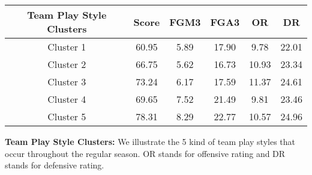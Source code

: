 \centering
\begin{tabular}{|c||c|c|c|c|c|} 
\hline
\textbf{Team Play Style Clusters} & Score & FGM3 & FGA3 & OR & DR \\ 
\hline
\hline
Cluster 1 & 60.95 & 5.89 & 17.90 & 9.78 & 22.01 \\ 
\hline
Cluster 2 & 66.75 & 5.62 & 16.73 & 10.93 & 23.34 \\
\hline
Cluster 3 & 73.24 & 6.17 & 17.59 & 11.37 & 24.61 \\
\hline
Cluster 4 & 69.65 & 7.52 & 21.49 & 9.81 & 23.46 \\
\hline
Cluster 5 & 78.31 & 8.29 & 22.77 & 10.57 & 24.96 \\
\hline
\end{tabular}
\caption{\textbf{Team Play Style Clusters:} We illustrate the 5 kind of team play styles that occur throughout the regular season. OR stands for offensive rating and DR stands for defensive rating.}
\label{table:clusters}